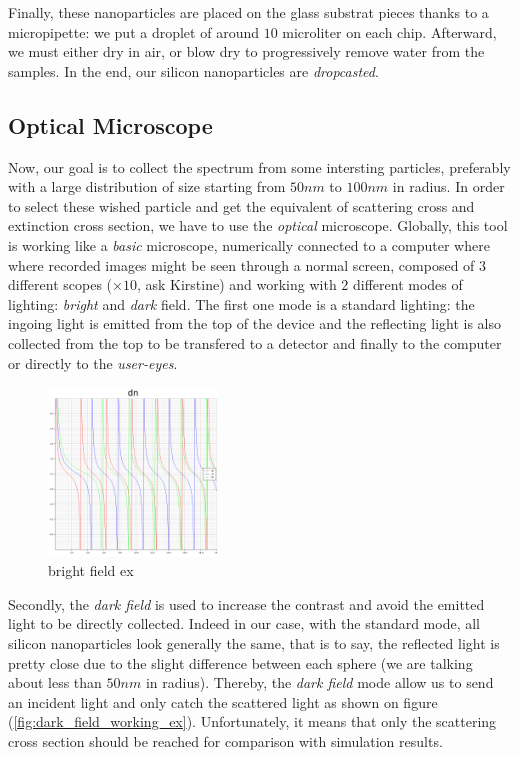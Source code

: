 \documentclass{article}
\numberwithin{equation}{section}
\begin{document}
Finally, these nanoparticles are placed on the glass substrat pieces thanks to a micropipette: we put a droplet of around $10$ microliter on each chip. Afterward, we must either dry in air, or blow dry to progressively remove water from the samples. In the end, our silicon nanoparticles are \textit{dropcasted}.

\subsection{Optical Microscope}

Now, our goal is to collect the spectrum from some intersting particles, preferably with a large distribution of size starting from $50 nm$ to $100 nm$ in radius. In order to select these wished particle and get the equivalent of scattering cross and extinction cross section, we have to use the \textit{optical} microscope. Globally, this tool is working like a \textit{basic} microscope, numerically connected to a computer where where recorded images might be seen through a normal screen, composed of $3$ different scopes ($\times 10$, ask Kirstine) and working with $2$ different modes of lighting: \textit{bright} and \textit{dark} field. The first one mode is a standard lighting: the ingoing light is emitted from the top of the device and the reflecting light is also collected from the top to be transfered to a detector and finally to the computer or directly to the \textit{user-eyes}.
\begin{figure}[h]
    \centering
    \includegraphics[width=0.4\textwidth, height=0.35\textwidth]{dn.png}
    \caption{bright field ex}
    \label{fig:bright_field_ex}
\end{figure}
Secondly, the \textit{dark field} is used to increase the contrast and avoid the emitted light to be directly collected. Indeed in our case, with the standard mode, all silicon nanoparticles look generally the same, that is to say, the reflected light is pretty close due to the slight difference between each sphere (we are talking about less than $50 nm$ in radius). Thereby, the \textit{dark field} mode allow us to send an incident light and only catch the scattered light as shown on figure (\ref{fig:dark_field_working_ex}). Unfortunately, it means that only the scattering cross section should be reached for comparison with simulation results.
\end{document}
